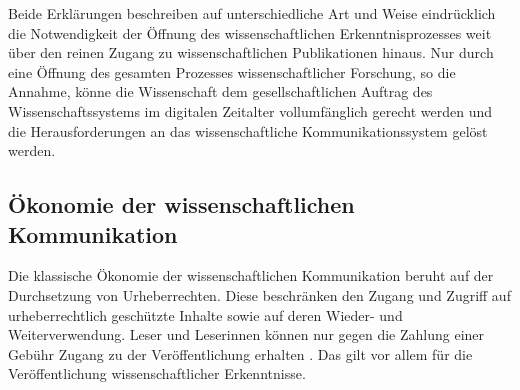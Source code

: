 Beide Erklärungen beschreiben auf unterschiedliche Art und Weise eindrücklich die Notwendigkeit der Öffnung des wissenschaftlichen Erkenntnisprozesses weit über den reinen Zugang zu wissenschaftlichen Publikationen hinaus. Nur durch eine Öffnung des gesamten Prozesses wissenschaftlicher Forschung, so die Annahme, könne die Wissenschaft dem gesellschaftlichen Auftrag des Wissenschaftssystems im digitalen Zeitalter vollumfänglich gerecht werden und die Herausforderungen an das wissenschaftliche Kommunikationssystem gelöst werden.

\subsection{Ökonomie der wissenschaftlichen Kommunikation}

Die klassische Ökonomie der wissenschaftlichen Kommunikation beruht auf der Durchsetzung von Urheberrechten. Diese beschränken den Zugang und Zugriff auf urheberrechtlich geschützte Inhalte sowie auf deren Wieder- und Weiterverwendung. Leser und Leserinnen können nur gegen die Zahlung einer Gebühr Zugang zu der Veröffentlichung erhalten \cite{CREATe_2014}. Das gilt vor allem für die Veröffentlichung wissenschaftlicher Erkenntnisse.

